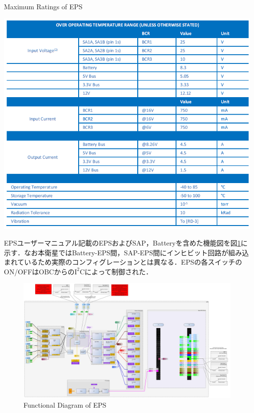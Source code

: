 \begin{table}[htbp]
	\centering
	\caption{Maximum Ratings of EPS \cite{eps_um}}
	\includegraphics[width=0.9\linewidth]{./03/fig/eps_max.png}
	\label{table3_1_eps_max}
\end{table}


EPSユーザーマニュアル記載のEPSおよびSAP，Batteryを含めた機能図を図\ref{fig3-1_eps_bd}に示す．なお本衛星ではBattery-EPS間，SAP-EPS間にインヒビット回路が組み込まれているため実際のコンフィグレーションとは異なる．EPSの各スイッチのON/OFFはOBCからの$\mathrm{I^{2}C}$によって制御された．

\begin{landscape}
\begin{figure}[H]
	\centering
	\includegraphics[width=0.9\linewidth]{./03/fig/eps_bd.jpg}
	\caption{Functional Diagram of EPS \cite{eps_um}}
	\label{fig3-1_eps_bd}
\end{figure}
\end{landscape}